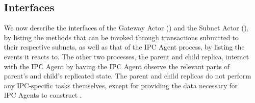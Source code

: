 
\subsection{Interfaces}

We now describe the interfaces of the Gateway Actor (\gw) and the Subnet Actor (\sa), by listing the methods that can be invoked through transactions submitted to their respective subnets,
as well as that of the IPC Agent process, by listing the events it reacts to.
The other two processes, the parent and child replica, interact with the IPC Agent by having the IPC Agent observe the relevant parts of parent's and child's replicated state.
The parent and child replicas do not perform any IPC-specific tasks themselves, except for providing the data necessary for IPC Agents to construct \pofsFull.

